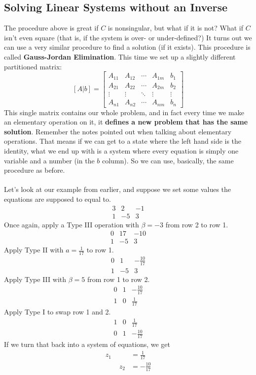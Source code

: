 \documentclass[10pt]{article}
\begin{document}
\subsection*{Solving Linear Systems without an Inverse}
The procedure above is great if $C$ is nonsingular, but what if it is not?  What if $C$ isn't even square (that is, if the system is over- or under-defined?)  It turns out we can use a very similar procedure to find a solution (if it exists).  This procedure is called \textbf{Gauss-Jordan Elimination}.  This time we set up a slightly different partitioned matrix:
\[[A | b] = \left[\begin{array}{cccc|c}
    A_{11} & A_{12} & \cdots & A_{1m} & b_1 \\
    A_{21} & A_{22} & \cdots & A_{2m} & b_2 \\
    \vdots & \vdots & \ddots & \vdots & \vdots \\
    A_{n1} & A_{n2} & \cdots & A_{nm} & b_n
\end{array}\right]\]
This single matrix contains our whole problem, and in fact every time we make an elementary operation on it, it \textbf{defines a new problem that has the same solution}.  Remember the notes pointed out when talking about elementary operations.  That means if we can get to a state where the left hand side is the identity, what we end up with is a system where every equation is simply one variable and a number (in the $b$ column).  So we can use, basically, the same procedure as before.\\\\
Let's look at our example from earlier, and suppose we set some values the equations are supposed to equal to.
\[\begin{array}{cc|c} 3 & 2 & -1 \\ 1 & -5 & 3 \end{array}\]
Once again, apply a Type III operation with $\beta = -3$ from row 2 to row 1.
\[\begin{array}{cc|c} 0 & 17 & -10 \\ 1 & -5 & 3 \end{array}\]
Apply Type II with $a = \frac{1}{17}$ to row 1.
\[\begin{array}{cc|c} 0 & 1 & -\frac{10}{17} \\ 1 & -5 & 3 \end{array}\]
Apply Type III with $\beta = 5$ from row 1 to row 2.
\[\begin{array}{cc|c} 0 & 1 & -\frac{10}{17} \\ 1 & 0 & \frac{1}{17} \end{array}\]
Apply Type I to swap row 1 and 2.
\[\begin{array}{cc|c} 1 & 0 & \frac{1}{17} \\ 0 & 1 & -\frac{10}{17} \end{array}\]
If we turn that back into a system of equations, we get
\begin{align*}
z_1 \quad\quad &= \frac{1}{17}\\
\quad\quad z_2 &= -\frac{10}{17}
\end{align*}
\end{document}
